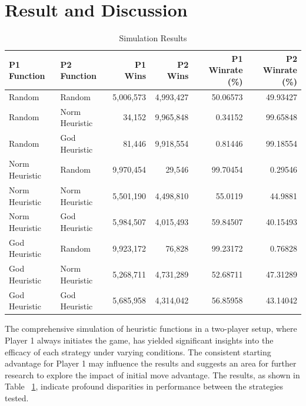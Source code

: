 \documentclass{telkomnika}
\begin{document}
\section{Result and Discussion}
\begin{table}[htbp]
\centering
\caption{Simulation Results}
\label{tab:heuristic_results}
\begin{tabular}{@{}llrrrr@{}}
\toprule
\textbf{P1 Function} & \textbf{P2 Function} & \textbf{P1 Wins} & \textbf{P2 Wins} & \textbf{P1 Winrate (\%)} & \textbf{P2 Winrate (\%)} \\ \midrule
Random         & Random            & 5,006,573 & 4,993,427 & 50.06573 & 49.93427 \\
Random         & Norm Heuristic    & 34,152    & 9,965,848 & 0.34152  & 99.65848 \\
Random         & God Heuristic     & 81,446    & 9,918,554 & 0.81446  & 99.18554 \\
Norm Heuristic & Random            & 9,970,454 & 29,546    & 99.70454 & 0.29546  \\
Norm Heuristic & Norm Heuristic    & 5,501,190 & 4,498,810 & 55.0119  & 44.9881  \\
Norm Heuristic & God Heuristic     & 5,984,507 & 4,015,493 & 59.84507 & 40.15493 \\
God Heuristic  & Random            & 9,923,172 & 76,828    & 99.23172 & 0.76828  \\
God Heuristic  & Norm Heuristic    & 5,268,711 & 4,731,289 & 52.68711 & 47.31289 \\
God Heuristic  & God Heuristic     & 5,685,958 & 4,314,042 & 56.85958 & 43.14042 \\ \bottomrule
\end{tabular}
\end{table}

The comprehensive simulation of heuristic functions in a two-player setup, where Player 1 always initiates the game, has yielded significant insights into the efficacy of each strategy under varying conditions. The consistent starting advantage for Player 1 may influence the results and suggests an area for further research to explore the impact of initial move advantage. The results, as shown in Table ~\ref{tab:heuristic_results}, indicate profound disparities in performance between the strategies tested.
\end{document}
